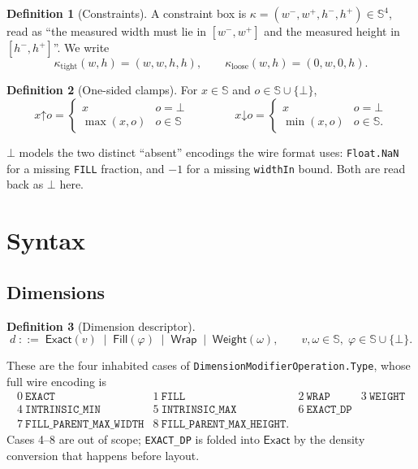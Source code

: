\documentclass[11pt,a4paper]{article}
\newcommand{\Sc}{\mathbb{S}}
\newcommand{\bo}{\bot}
\newcommand{\Exact}{\mathsf{Exact}}
\newcommand{\Fill}{\mathsf{Fill}}
\newcommand{\Wrap}{\mathsf{Wrap}}
\newcommand{\Weight}{\mathsf{Weight}}
\newcommand{\clampL}{\mathord{\uparrow}}
\newcommand{\clampH}{\mathord{\downarrow}}
\newcommand{\jv}[1]{\texttt{#1}}       %
\theoremstyle{definition}
\newtheorem{definition}{Definition}[section]
\theoremstyle{plain}
\theoremstyle{remark}
\begin{document}
\begin{definition}[Constraints]
A constraint box is $\kappa = (w^-, w^+, h^-, h^+) \in \Sc^4$, read as
``the measured width must lie in $[w^-, w^+]$ and the measured height in
$[h^-, h^+]$''. We write
\[
  \kappa_{\mathrm{tight}}(w,h) = (w,w,h,h), \qquad
  \kappa_{\mathrm{loose}}(w,h) = (0,w,0,h).
\]
\end{definition}

\begin{definition}[One-sided clamps]
For $x \in \Sc$ and $o \in \Sc \cup \{\bo\}$,
\[
  x \clampL o = \begin{cases} x & o = \bo \\ \max(x, o) & o \in \Sc \end{cases}
  \qquad\qquad
  x \clampH o = \begin{cases} x & o = \bo \\ \min(x, o) & o \in \Sc. \end{cases}
\]
\end{definition}

$\bo$ models the two distinct ``absent'' encodings the wire format uses:
\jv{Float.NaN} for a missing \jv{FILL} fraction, and $-1$ for a missing
\jv{widthIn} bound. Both are read back as $\bo$ here.

\section{Syntax}

\subsection{Dimensions}

\begin{definition}[Dimension descriptor]
\[
  d \;::=\; \Exact(v) \;\mid\; \Fill(\varphi) \;\mid\; \Wrap
        \;\mid\; \Weight(\omega),
  \qquad v, \omega \in \Sc,\; \varphi \in \Sc \cup \{\bo\}.
\]
\end{definition}

These are the four inhabited cases of
\jv{DimensionModifierOperation.Type}, whose full wire encoding is
\[
  \begin{array}{llll}
    0\ \jv{EXACT} & 1\ \jv{FILL} & 2\ \jv{WRAP} & 3\ \jv{WEIGHT} \\
    4\ \jv{INTRINSIC\_MIN} & 5\ \jv{INTRINSIC\_MAX} & 6\ \jv{EXACT\_DP} & \\
    7\ \jv{FILL\_PARENT\_MAX\_WIDTH} & 8\ \jv{FILL\_PARENT\_MAX\_HEIGHT}. & &
  \end{array}
\]
Cases 4--8 are out of scope; \jv{EXACT\_DP} is folded into $\Exact$ by the
density conversion that happens before layout.
\end{document}
